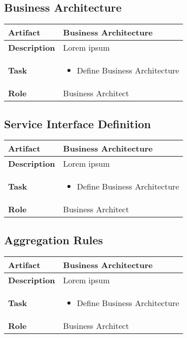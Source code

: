 \subsection{Business Architecture}
\begin{minipage}{\textwidth}
 \label{table:ch6_Artifact_Business_Architecture}
\begin{tabular}
	{|m{2cm}|m{10cm}|} \hline \bfseries Artifact & Business Architecture\\
	\hline \bfseries Description & Lorem ipsum\\
	\hline \bfseries Task & 
	\begin{itemize}
		\item Define Business Architecture 
	\end{itemize}
	\\
	\hline \bfseries Role & Business Architect\\
	\hline 
\end{tabular}
\end{minipage}

\subsection{Service Interface Definition}
\begin{minipage}{\textwidth}
 \label{table:ch6_Artifact_Service_Interface_Definition}
\begin{tabular}
	{|m{2cm}|m{10cm}|} \hline \bfseries Artifact & Business Architecture\\
	\hline \bfseries Description & Lorem ipsum\\
	\hline \bfseries Task & 
	\begin{itemize}
		\item Define Business Architecture 
	\end{itemize}
	\\
	\hline \bfseries Role & Business Architect\\
	\hline 
\end{tabular}
\end{minipage}

\subsection{Aggregation Rules}
\begin{minipage}{\textwidth}
 \label{table:ch6_Artifact_Aggregation_Rules}
\begin{tabular}
	{|m{2cm}|m{10cm}|} \hline \bfseries Artifact & Business Architecture\\
	\hline \bfseries Description & Lorem ipsum\\
	\hline \bfseries Task & 
	\begin{itemize}
		\item Define Business Architecture 
	\end{itemize}
	\\
	\hline \bfseries Role & Business Architect\\
	\hline 
\end{tabular}
\end{minipage}

